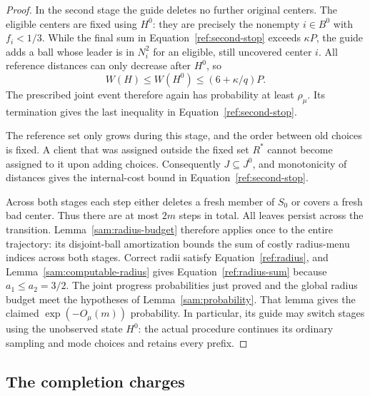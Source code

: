 \begin{proof}
In the second stage the guide deletes no further original centers.  The
eligible centers are fixed using $H^0$: they are precisely the nonempty
$i\in B^0$ with $f_i<1/3$.  While the final sum in
Equation~\eqref{ref:second-stop} exceeds $\kappa P$, the guide adds a ball whose
leader is in $N_i^2$ for an eligible, still uncovered center $i$.
All reference distances can only decrease after $H^0$, so
\[
 W(H)\le W(H^0)\le(6+\kappa/q)P.
\]
The prescribed joint event therefore again has probability at least
$\rho_\mu$.  Its termination gives the last inequality in
Equation~\eqref{ref:second-stop}.

The reference set only grows during this stage, and the order between old
choices is fixed.  A client that was assigned outside the fixed set $R^*$
cannot become assigned to it upon adding choices.  Consequently
$J\subseteq J^0$, and monotonicity of distances gives the internal-cost
bound in Equation~\eqref{ref:second-stop}.

Across both stages each step either deletes a fresh member of $S_0$ or
covers a fresh bad center.  Thus there are at most $2m$ steps in total.
All leaves persist across the transition.  Lemma~\ref{sam:radius-budget}
therefore applies once to the entire trajectory: its disjoint-ball
amortization bounds the sum of costly radius-menu indices across both
stages.  Correct radii satisfy Equation~\eqref{ref:radius}, and
Lemma~\ref{sam:computable-radius} gives Equation~\eqref{ref:radius-sum} because
$a_1\le a_2=3/2$.  The joint progress probabilities just proved and the
global radius budget meet the hypotheses of Lemma~\ref{sam:probability}.
That lemma gives the claimed $\exp(-O_\mu(m))$ probability.
In particular, its guide may switch stages using the unobserved state
$H^0$: the actual procedure continues its ordinary sampling and mode
choices and retains every prefix.
\end{proof}

\subsection{The completion charges}

